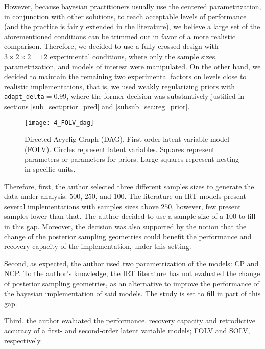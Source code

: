 However, because bayesian practitioners usually use the centered parametrization, in conjunction with other solutions, to reach acceptable levels of performance (and the practice is fairly extended in the literature), we believe a large set of the aforementioned conditions can be trimmed out in favor of a more realistic comparison. Therefore, we decided to use a fully crossed design with $3 \times 2 \times 2 = 12$ experimental conditions, where only the sample sizes, parametrization, and models of interest were manipulated. On the other hand, we decided to maintain the remaining two experimental factors on levels close to realistic implementations, that is, we used weakly regularizing priors with \texttt{adapt\_delta}$=0.99$, where the former decision was substantively justified in sections \ref{sub_sect:prior_pred} and \ref{subsub_sec:reg_prior}.
%
\begin{figure}[H]
	\centering
	\texttt{[image: 4\_FOLV\_dag]}
	\caption[Directed Acyclig Graph (DAG). First-order latent variable model (FOLV).]%
	{Directed Acyclig Graph (DAG). First-order latent variable model (FOLV). Circles represent latent variables. Squares represent parameters or parameters for priors. Large squares represent nesting in specific units.}
	\label{fig:FOLV_model}
\end{figure}

Therefore, first, the author selected three different samples sizes to generate the data under analysis: $500$, $250$, and $100$. The literature on IRT models present several implementations with samples sizes above $250$, however, few present samples lower than that. The author decided to use a sample size of a $100$ to fill in this gap. Moreover, the decision was also supported by the notion that the change of the posterior sampling geometries could benefit the performance and recovery capacity of the implementation, under this setting.

Second, as expected, the author used two parametrization of the models: CP and NCP. To the author's knowledge, the IRT literature has not evaluated the change of posterior sampling geometries, as an alternative to improve the performance of the bayesian implementation of said models. The study is set to fill in part of this gap.

Third, the author evaluated the performance, recovery capacity and retrodictive accuracy of a first- and second-order latent variable models; FOLV and SOLV, respectively.

